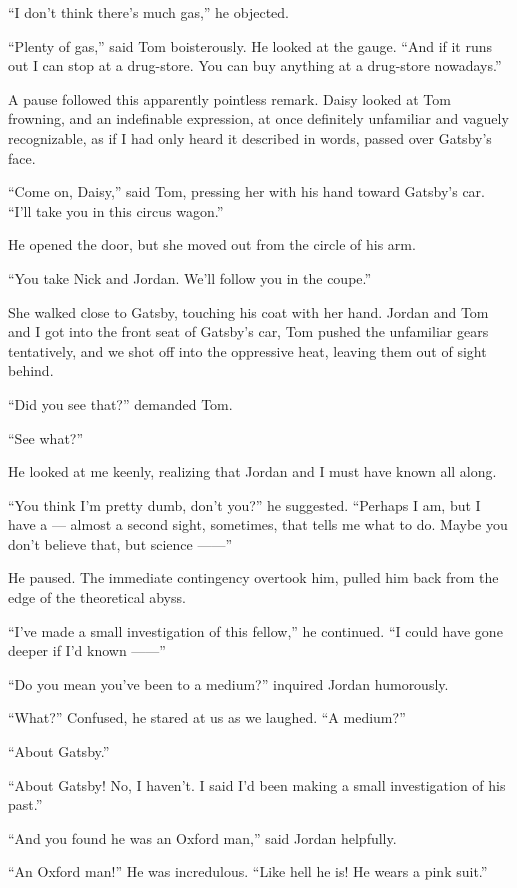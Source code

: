\documentclass{znotebook}
\begin{document}
``I don't think there's much gas,'' he objected.

``Plenty of gas,'' said Tom boisterously. He looked at the gauge. ``And if it runs out I can stop at a drug-store. You can buy anything at a drug-store nowadays.''

A pause followed this apparently pointless remark. Daisy looked at Tom frowning, and an indefinable expression, at once definitely unfamiliar and vaguely recognizable, as if I had only heard it described in words, passed over Gatsby's face.

``Come on, Daisy,'' said Tom, pressing her with his hand toward Gatsby's car. ``I'll take you in this circus wagon.''

He opened the door, but she moved out from the circle of his arm.

``You take Nick and Jordan. We'll follow you in the coupe.''

She walked close to Gatsby, touching his coat with her hand. Jordan and Tom and I got into the front seat of Gatsby's car, Tom pushed the unfamiliar gears tentatively, and we shot off into the oppressive heat, leaving them out of sight behind.

``Did you see that?'' demanded Tom.

``See what?''

He looked at me keenly, realizing that Jordan and I must have known all along.

``You think I'm pretty dumb, don't you?'' he suggested. ``Perhaps I am, but I have a — almost a second sight, sometimes, that tells me what to do. Maybe you don't believe that, but science ——''

He paused. The immediate contingency overtook him, pulled him back from the edge of the theoretical abyss.

``I've made a small investigation of this fellow,'' he continued. ``I could have gone deeper if I'd known ——''

``Do you mean you've been to a medium?'' inquired Jordan humorously.

``What?'' Confused, he stared at us as we laughed. ``A medium?''

``About Gatsby.''

``About Gatsby! No, I haven't. I said I'd been making a small investigation of his past.''

``And you found he was an Oxford man,'' said Jordan helpfully.

``An Oxford man!'' He was incredulous. ``Like hell he is! He wears a pink suit.''
\end{document}
